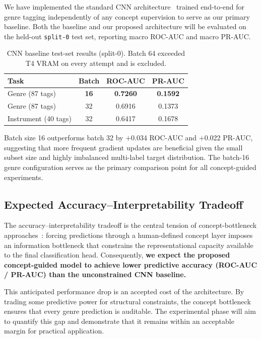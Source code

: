 \documentclass[sigconf,nonacm]{acmart}
\begin{document}
We have implemented the standard CNN architecture~\cite{hershey2017cnn} trained end-to-end for genre
tagging independently of any concept supervision to serve as our primary baseline. Both the
baseline and our proposed architecture will be evaluated on the held-out \texttt{split-0} test
set, reporting macro ROC-AUC and macro PR-AUC.

\begin{table}[h]
  \caption{CNN baseline test-set results (split-0). Batch 64 exceeded T4 VRAM on every
           attempt and is excluded.}
  \label{tab:baseline}
  \begin{tabular}{lccc}
    \toprule
    Task & Batch & ROC-AUC & PR-AUC \\
    \midrule
    Genre (87 tags)      & \textbf{16} & \textbf{0.7260} & \textbf{0.1592} \\
    Genre (87 tags)      & 32          & 0.6916          & 0.1373          \\
    Instrument (40 tags) & 32          & 0.6417          & 0.1678          \\
    \bottomrule
  \end{tabular}
\end{table}

Batch size 16 outperforms batch 32 by $+$0.034 ROC-AUC and $+$0.022 PR-AUC, suggesting that
more frequent gradient updates are beneficial given the small subset size and highly imbalanced
multi-label target distribution. The batch-16 genre configuration serves as the primary
comparison point for all concept-guided experiments.

\subsection{Expected Accuracy--Interpretability Tradeoff}

The accuracy--interpretability tradeoff is the central tension of concept-bottleneck
approaches~\cite{koh2020concept}: forcing predictions through a human-defined concept layer
imposes an information bottleneck that constrains the representational capacity available to the
final classification head. Consequently, \textbf{we expect the proposed concept-guided model to
achieve lower predictive accuracy (ROC-AUC / PR-AUC) than the unconstrained CNN baseline.}

This anticipated performance drop is an accepted cost of the architecture. By trading some
predictive power for structural constraints, the concept bottleneck ensures that every genre
prediction is auditable. The experimental phase will aim to quantify this gap and demonstrate
that it remains within an acceptable margin for practical application.
\end{document}
